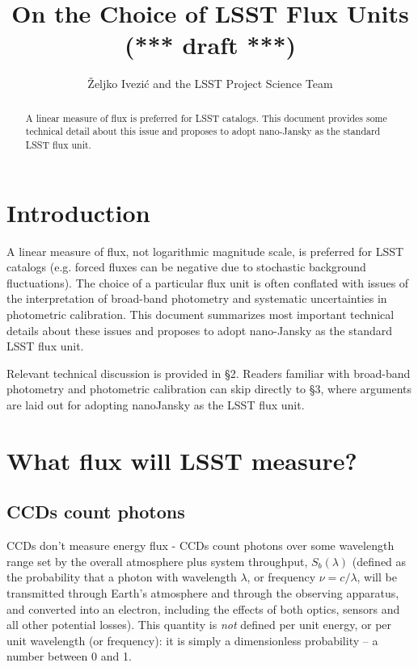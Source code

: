 \documentclass{emulateapj}
\begin{document}
\title{On the Choice of LSST Flux Units (*** draft ***)} 
\author{\v{Z}eljko Ivezi\'{c} and the LSST Project Science Team} 


\begin{abstract}

A linear measure of flux is preferred for LSST catalogs. This document
provides some technical detail about this issue and proposes to adopt
nano-Jansky as the standard LSST flux unit.  

\end{abstract}


\section{Introduction} 

A linear measure of flux, not logarithmic magnitude scale, is preferred
for LSST catalogs (e.g. forced fluxes can be negative due to stochastic
background fluctuations). The choice of a particular flux unit is often
conflated with issues of the interpretation of broad-band photometry 
and systematic uncertainties in photometric calibration. This document
summarizes most important technical details about these issues and 
proposes to adopt nano-Jansky as the standard LSST flux unit. 

Relevant technical discussion is provided in \S 2. Readers familiar 
with broad-band photometry and photometric calibration can skip
directly to \S 3, where  arguments are laid out for adopting nanoJansky 
as the LSST flux unit. 


\section{What flux will LSST measure?} 


\subsection{CCDs count photons} 

CCDs don't measure energy flux - CCDs count photons over some wavelength range set 
by the overall atmosphere plus system throughput,  $S_b(\lambda)$ (defined as the probability 
that a photon with wavelength $\lambda$, or frequency $\nu=c/\lambda$,  will be 
transmitted through Earth's atmosphere and through the observing apparatus, and converted
into an electron, including the effects of both optics, sensors and all other potential losses). 
This quantity is {\it not}  defined per unit energy, or per unit wavelength (or frequency): 
it is simply a dimensionless probability -- a number between 0 and 1. 
\end{document}
